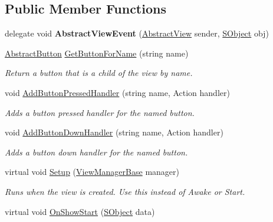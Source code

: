 \subsection*{Public Member Functions}
\begin{DoxyCompactItemize}
\item 
\hypertarget{class_scaffolding_1_1_abstract_view_a49247000d508f81e25846e1998a90a26}{delegate void {\bfseries Abstract\+View\+Event} (\hyperlink{class_scaffolding_1_1_abstract_view}{Abstract\+View} sender, \hyperlink{class_scaffolding_1_1_s_object}{S\+Object} obj)}\label{class_scaffolding_1_1_abstract_view_a49247000d508f81e25846e1998a90a26}

\item 
\hyperlink{class_scaffolding_1_1_abstract_button}{Abstract\+Button} \hyperlink{class_scaffolding_1_1_abstract_view_a77bcaa12d078eff7aa7bbaa30cb5bbda}{Get\+Button\+For\+Name} (string name)
\begin{DoxyCompactList}\small\item\em Return a button that is a child of the view by name. \end{DoxyCompactList}\item 
void \hyperlink{class_scaffolding_1_1_abstract_view_adb8d1d723fc56128e54f9267b9985cec}{Add\+Button\+Pressed\+Handler} (string name, Action handler)
\begin{DoxyCompactList}\small\item\em Adds a button pressed handler for the named button. \end{DoxyCompactList}\item 
void \hyperlink{class_scaffolding_1_1_abstract_view_ac12bfa146c003591cf231ca61770207e}{Add\+Button\+Down\+Handler} (string name, Action handler)
\begin{DoxyCompactList}\small\item\em Adds a button down handler for the named button. \end{DoxyCompactList}\item 
virtual void \hyperlink{class_scaffolding_1_1_abstract_view_a9af94b623e26a958d6295fc3b89eab0b}{Setup} (\hyperlink{class_scaffolding_1_1_view_manager_base}{View\+Manager\+Base} manager)
\begin{DoxyCompactList}\small\item\em Runs when the view is created. Use this instead of Awake or Start. \end{DoxyCompactList}\item 
virtual void \hyperlink{class_scaffolding_1_1_abstract_view_a7c4ad4fbf3039a5acc67a16e6672510e}{On\+Show\+Start} (\hyperlink{class_scaffolding_1_1_s_object}{S\+Object} data)

\end{DoxyCompactItemize}

